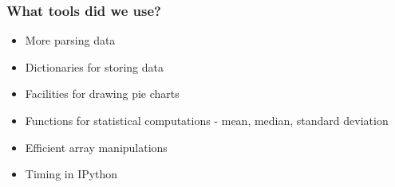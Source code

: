 \documentclass[14pt,compress]{beamer}
\begin{document}
\begin{frame}[fragile]
  \frametitle{What tools did we use?}
  \begin{itemize}
   \item More parsing data
   \item Dictionaries for storing data
   \item Facilities for drawing pie charts
   \item Functions for statistical computations - mean, median, standard deviation
   \item Efficient array manipulations
   \item Timing in IPython
  \end{itemize}

\end{frame}
\end{document}
